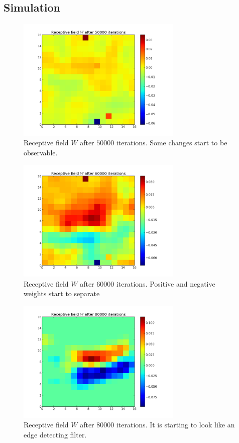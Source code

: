 \subsection{Simulation}

\begin{figure}[h]
\centering
\includegraphics[width=0.7\textwidth]{../ex3/results1/img06}
\caption{Receptive field $W$ after $50000$ iterations. Some changes start to be
observable.}
\label{fig:img06}
\end{figure}

\begin{figure}[h]
\centering
\includegraphics[width=0.7\textwidth]{../ex3/results1/img07}
\caption{Receptive field $W$ after $60000$ iterations. Positive and negative
weights start to separate}
\label{fig:img07}
\end{figure}

\begin{figure}[h]
\centering
\includegraphics[width=0.7\textwidth]{../ex3/results1/img09}
\caption{Receptive field $W$ after $80000$ iterations. It is starting to look
like an edge detecting filter.}
\label{fig:img09}
\end{figure}

